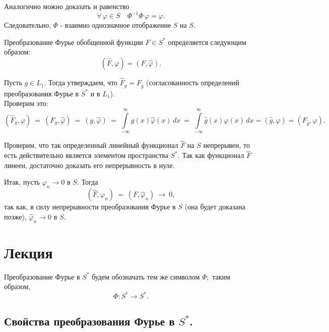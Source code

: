 \documentclass[a4paper]{article}
\newcommand{\ff} {\varphi}
\newcommand{\ir} {\int \limits_{-\infty}^{\infty}}
\newcommand{\w}{\widehat}
\newcommand{\wphi}{\widehat{\varphi}}
\begin{document}
Аналогично можно доказать и равенство
$$
\forall\, \ff \in S \quad  \Phi^{-1} \Phi \,\varphi = \varphi.
$$
Следовательно, $\Phi$ - взаимно однозначное отображение $S$ на
$S$.

\begin{df}
Преобразование Фурье обобщенной функции $F \in S^*$ определяется
следующим образом:
$$(\widehat{F}, \varphi) = (F, \wphi).$$
\end{df}

Пусть $g \in L_1$. Тогда утверждаем, что $\widehat{F}_g =
F_{\widehat{g}}$ (согласованность определений преобразования Фурье в $S^{*}$  и в $L_1$).\\
Проверим это:
$$
(\w{F}_g, \varphi)\  =\  (F_g, \wphi)\  =\  (g, \wphi)\  =\  \ir
g(x) \wphi(x) \, dx \ =\  \ir \widehat{g}(x) \varphi(x) \, dx =
(\w{g}, \varphi) = (F_{\widehat{g}}, \varphi).
$$

Проверим, что так определенный линейный функционал $\w{F}$ на $S$
непрерывен, то есть действительно является элементом пространства
$S^{*}.$ Так как функционал $\w{F}$ линеен, достаточно доказать
его непрерывность в нуле.

Итак, пусть $\ff_n \rightarrow 0$ в $S.$ Тогда
$$
(\w{F}, \ff_n)\ = \ (F, \w{\ff}_n) \ \longrightarrow\ 0,
$$
так как, в силу непрерывности преобразования Фурье в $S$ (она
будет доказана позже), $\w{\ff}_n \rightarrow 0$ в $S.$


\section{Лекция}

Преобразование Фурье в $S^{*}$ будем обозначать тем же символом
$\Phi;$ таким образом,
$$\Phi : S^* \rightarrow S^*.$$

\subsection{Свойства преобразования Фурье в $S^*$.}
\end{document}

